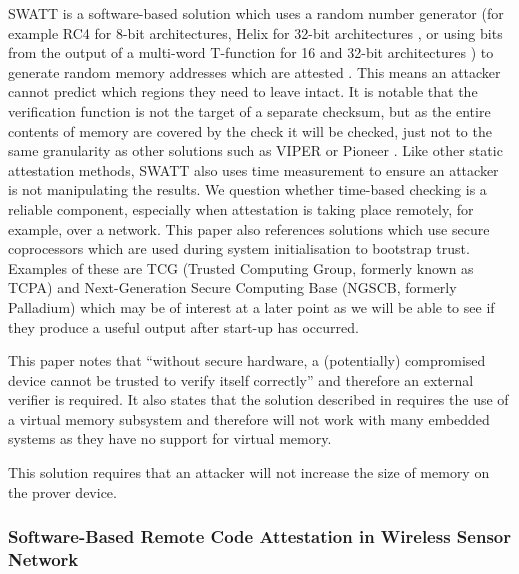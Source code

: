 SWATT is a software-based solution which uses a random number generator (for example RC4 for 8-bit architectures, Helix for 32-bit architectures \cite{Ferguson2003}, or using bits from the output of a multi-word T-function for 16 and 32-bit architectures \cite{Klimov2004}) to generate random memory addresses which are attested \cite{Seshadri2004}. This means an attacker cannot predict which regions they need to leave intact. It is notable that the verification function is not the target of a separate checksum, but as the entire contents of memory are covered by the check it will be checked, just not to the same granularity as other solutions such as VIPER \cite{Li2011} or Pioneer \cite{Seshadri2007}. Like other static attestation methods, SWATT also uses time measurement to ensure an attacker is not manipulating the results. We question whether time-based checking is a reliable component, especially when attestation is taking place remotely, for example, over a network.
This paper also references solutions which use secure coprocessors which are used during system initialisation to bootstrap trust. Examples of these are TCG (Trusted Computing Group, formerly known as TCPA) and Next-Generation Secure Computing Base (NGSCB, formerly Palladium) which may be of interest at a later point as we will be able to see if they produce a useful output after start-up has occurred.

This paper notes that ``without secure hardware, a (potentially) compromised device cannot be trusted to verify itself correctly'' and therefore an external verifier is required. It also states that the solution described in \cite{Kennell2003} requires the use of a virtual memory subsystem and therefore will not work with many embedded systems as they have no support for virtual memory.

This solution requires that an attacker will not increase the size of memory on the prover device. 


\subsubsection*{Software-Based Remote Code Attestation in Wireless Sensor Network}

